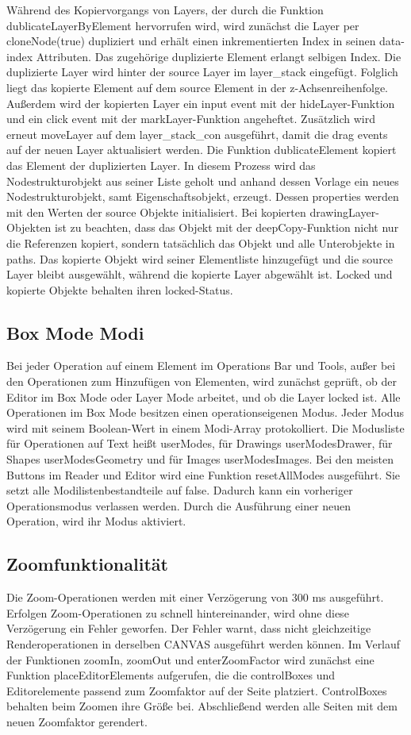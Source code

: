 Während des Kopiervorgangs von Layers, der durch die Funktion dublicateLayerByElement hervorrufen wird, wird zunächst die Layer per cloneNode(true) dupliziert und erhält einen inkrementierten Index in seinen data-index Attributen. Das zugehörige duplizierte Element erlangt selbigen Index. Die duplizierte Layer wird hinter der source Layer im layer\_stack eingefügt. Folglich liegt das kopierte Element auf dem source Element in der z-Achsenreihenfolge. Außerdem wird der kopierten Layer ein input event mit der hideLayer-Funktion und ein click event mit der markLayer-Funktion angeheftet. Zusätzlich wird erneut moveLayer auf dem layer\_stack\_con ausgeführt, damit die drag events auf der neuen Layer aktualisiert werden. Die Funktion dublicateElement kopiert das Element der duplizierten Layer. In diesem Prozess wird das Nodestrukturobjekt aus seiner Liste geholt und anhand dessen Vorlage ein neues Nodestrukturobjekt, samt Eigenschaftsobjekt, erzeugt. Dessen properties werden mit den Werten der source Objekte initialisiert. Bei kopierten drawingLayer-Objekten ist zu beachten, dass das Objekt mit der deepCopy-Funktion nicht nur die Referenzen kopiert, sondern tatsächlich das Objekt und alle Unterobjekte in paths. Das kopierte Objekt wird seiner Elementliste hinzugefügt und die source Layer bleibt ausgewählt, während die kopierte Layer abgewählt ist. Locked und kopierte Objekte behalten ihren locked-Status.

\subsection{Box Mode Modi}
Bei jeder Operation auf einem Element im Operations Bar und Tools, außer bei den Operationen zum Hinzufügen von Elementen, wird zunächst geprüft, ob der Editor im Box Mode oder Layer Mode arbeitet, und ob die Layer locked ist. Alle Operationen im Box Mode besitzen einen operationseigenen Modus. Jeder Modus wird mit seinem Boolean-Wert in einem Modi-Array protokolliert. Die Modusliste für Operationen auf Text heißt userModes, für Drawings userModesDrawer, für Shapes userModesGeometry und für Images userModesImages. Bei den meisten Buttons im Reader und Editor wird eine Funktion resetAllModes ausgeführt. Sie setzt alle Modilistenbestandteile auf false. Dadurch kann ein vorheriger Operationsmodus verlassen werden. Durch die Ausführung einer neuen Operation, wird ihr Modus aktiviert.

\subsection{Zoomfunktionalität}
Die Zoom-Operationen werden mit einer Verzögerung von 300 ms ausgeführt. Erfolgen Zoom-Operationen zu schnell hintereinander, wird ohne diese Verzögerung ein Fehler geworfen. Der Fehler warnt, dass nicht gleichzeitige Renderoperationen in derselben CANVAS ausgeführt werden können. Im Verlauf der Funktionen zoomIn, zoomOut und enterZoomFactor wird zunächst eine Funktion placeEditorElements aufgerufen, die die controlBoxes und Editorelemente passend zum Zoomfaktor auf der Seite platziert. ControlBoxes behalten beim Zoomen ihre Größe bei. Abschließend werden alle Seiten mit dem neuen Zoomfaktor gerendert.

